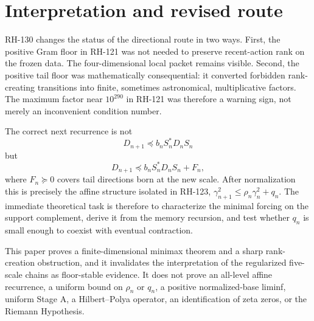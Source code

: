 \documentclass[12pt]{article}
\begin{document}
\section{Interpretation and revised route}
RH-130 changes the status of the directional route in two ways.  First, the
positive Gram floor in RH-121 was not needed to preserve recent-action rank
on the frozen data.  The four-dimensional local packet remains visible.
Second, the positive tail floor was mathematically consequential: it
converted forbidden rank-creating transitions into finite, sometimes
astronomical, multiplicative factors.  The maximum factor near
$10^{290}$ in RH-121 was therefore a warning sign, not merely an inconvenient
condition number.

The correct next recurrence is not
\[
 D_{n+1}\preceq b_nS_n^*D_nS_n
\]
but
\[
 D_{n+1}\preceq b_nS_n^*D_nS_n+F_n,
\]
where $F_n\succeq0$ covers tail directions born at the new scale.  After
normalization this is precisely the affine structure isolated in RH-123,
$\gamma_{n+1}^2\leq\rho_n\gamma_n^2+q_n$.  The immediate theoretical task
is therefore to characterize the minimal forcing on the support complement,
derive it from the memory recursion, and test whether $q_n$ is small enough
to coexist with eventual contraction.

This paper proves a finite-dimensional minimax theorem and a sharp
rank-creation obstruction, and it invalidates the interpretation of the
regularized five-scale chains as floor-stable evidence.  It does not prove
an all-level affine recurrence, a uniform bound on $\rho_n$ or $q_n$, a
positive normalized-base liminf, uniform Stage A, a Hilbert--Polya operator,
an identification of zeta zeros, or the Riemann Hypothesis.



\end{document}
